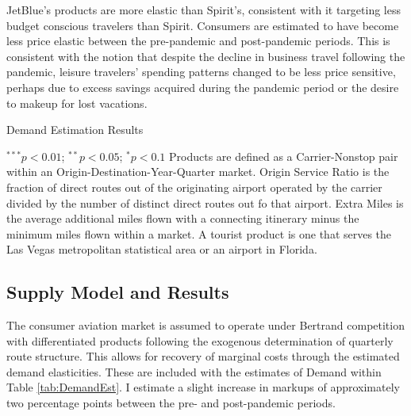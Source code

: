 \documentclass{article}
\begin{document}
     JetBlue's products are more elastic than Spirit's, consistent with it targeting less budget conscious travelers than Spirit. Consumers are estimated to have become less price elastic between the pre-pandemic and post-pandemic periods. This is consistent with the notion that despite the decline in business travel following the pandemic, leisure travelers' spending patterns changed to be less price sensitive, perhaps due to excess savings acquired during the pandemic period or the desire to makeup for lost vacations.   
    
    \begin{table}
        \caption{Demand Estimation Results}
        \label{tab:DemandEst}
        \vspace{-15mm}
        \begin{center}
        
                \footnotesize{$^{***}p<0.01$; $^{**}p<0.05$; $^{*}p<0.1$ Products are defined as a Carrier-Nonstop pair within an Origin-Destination-Year-Quarter market. Origin Service Ratio is the fraction of direct routes out of the originating airport operated by the carrier divided by the number of distinct direct routes out fo that airport. Extra Miles is the average additional miles flown with a connecting itinerary minus the minimum miles flown within a market.  A tourist product is one that serves the Las Vegas metropolitan statistical area or an airport in Florida.}

        \end{center}
    \end{table}
		
	\subsection{Supply Model and Results}
	\label{sec:Analysis_Supply}
	The consumer aviation market is assumed to operate under Bertrand competition with differentiated products following the exogenous determination of quarterly route structure. This allows for recovery of marginal costs through the estimated demand elasticities.  These are included with the estimates of Demand within Table \ref{tab:DemandEst}. I estimate a slight increase in markups of approximately two percentage points between the pre- and post-pandemic periods. 
	
	
\end{document}
